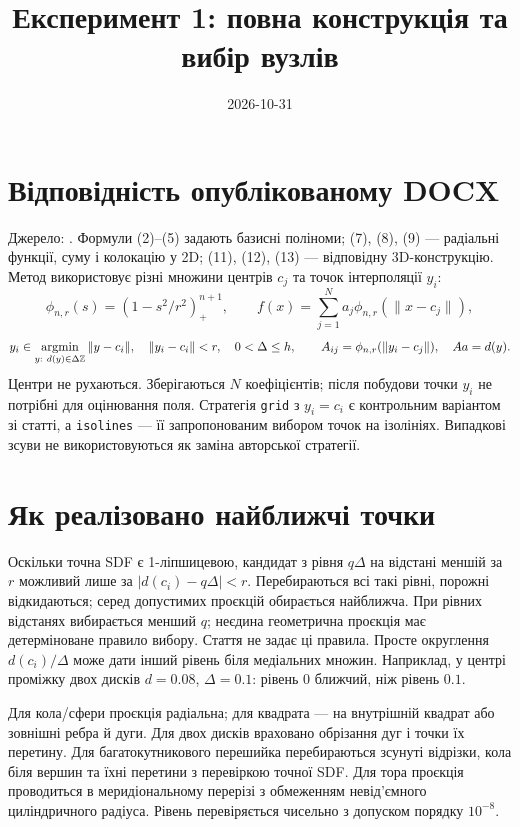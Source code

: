 \documentclass[11pt,a4paper]{article}
\begin{document}
\title{Експеримент 1: повна конструкція та вибір вузлів}\author{}\date{2026-10-31}\maketitle

\section*{Відповідність опублікованому DOCX}
Джерело: .
Формули (2)--(5) задають базисні поліноми; (7), (8), (9) ---
радіальні функції, суму і колокацію у 2D; (11), (12), (13) --- відповідну
3D-конструкцію. Метод використовує різні множини центрів $c_j$
та точок інтерполяції $y_i$:
\[
 \phi_{n,r}(s)=(1-s^2/r^2)_+^{n+1},\qquad
 f(x)=\sum_{j=1}^N a_j\phi_{n,r}(\|x-c_j\|),
\]
\[
 y_i\in\mathop{\rm argmin}_{y:\ d(y)\in\Delta\mathbb Z}\|y-c_i\|,
 \quad \|y_i-c_i\|<r,\quad 0<\Delta\le h,
 \qquad A_{ij}=\phi_{n,r}(\|y_i-c_j\|),\quad Aa=d(y).
\]
Центри не рухаються. Зберігаються $N$ коефіцієнтів; після побудови
точки $y_i$ не потрібні для оцінювання поля.
Стратегія \texttt{grid} з $y_i=c_i$ є контрольним варіантом зі статті,
а \texttt{isolines} --- її запропонованим вибором точок на ізолініях.
Випадкові зсуви не використовуються як заміна авторської стратегії.

\section*{Як реалізовано найближчі точки}
Оскільки точна SDF є 1-ліпшицевою, кандидат з рівня $q\Delta$
на відстані меншій за $r$ можливий лише за
$|d(c_i)-q\Delta|<r$. Перебираються всі такі рівні, порожні
відкидаються; серед допустимих проєкцій обирається найближча.
При рівних відстанях вибирається менший $q$; неєдина геометрична
проєкція має детерміноване правило вибору. Стаття не задає ці правила.
Просте округлення $d(c_i)/\Delta$ може дати інший рівень біля
медіальних множин. Наприклад, у центрі проміжку двох дисків $d=0.08$,
$\Delta=0.1$: рівень $0$ ближчий, ніж рівень $0.1$.

Для кола/сфери проєкція радіальна; для квадрата --- на внутрішній
квадрат або зовнішні ребра й дуги. Для двох дисків враховано обрізання
дуг і точки їх перетину. Для багатокутникового перешийка перебираються
зсунуті відрізки, кола біля вершин та їхні перетини з перевіркою
точної SDF. Для тора проєкція проводиться в меридіональному перерізі
з обмеженням невід'ємного циліндричного радіуса.
Рівень перевіряється чисельно з допуском порядку $10^{-8}$.
\end{document}

